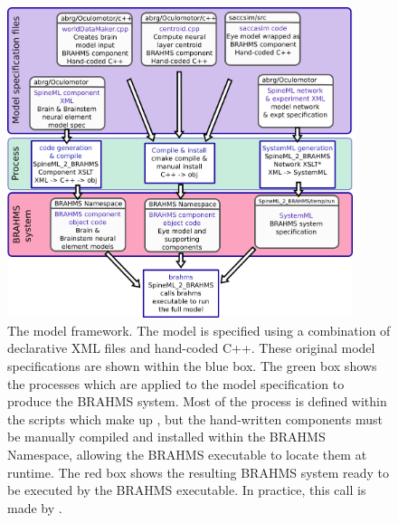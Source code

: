 \documentclass{frontiersSCNS}
\begin{document}
\begin{figure}[!ht]
\begin{center}
\includegraphics[width=0.9\textwidth]{./figures/model_framework.png}
\end{center}
\caption{ The model framework.  The model is specified using a combination of
declarative XML files and hand-coded C++. These original model
specifications are shown within the blue box.  The green box shows
the processes which are applied to the model specification to produce
the BRAHMS system. Most of the process is defined within the scripts
which make up \stob, but the hand-written components must be manually
compiled and installed within the BRAHMS Namespace, allowing the
BRAHMS executable to locate them at runtime.  The red box shows the
resulting BRAHMS system ready to be executed by the BRAHMS
executable. In practice, this call is made by \stob.}
\label{fig:modelframework}
\end{figure}
\end{document}
